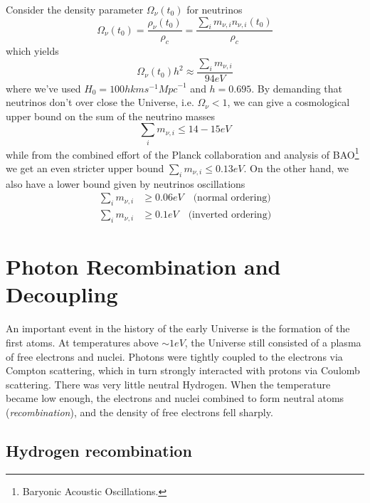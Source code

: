 Consider the density parameter $\Omega_{\nu}(t_{0})$ for neutrinos 
\begin{equation}
    \Omega_{\nu}(t_{0}) = \frac{\rho_{\nu}(t_{0})}{\rho_{c}} = \frac{\sum_{i} m_{\nu,i}n_{\nu,i}(t_{0})}{\rho_{c}}
\end{equation}
which yields
\begin{equation}
    \boxed{
        \Omega_{\nu}(t_{0})h^{2} \approx \frac{\sum_{i} m_{\nu,i}}{94 \unit{eV}}
    }
\end{equation}
where we've used $H_{0} = 100h \unit{km}\unit{s}^{-1}\unit{Mpc}^{-1}$ and $h = 0.695$. By demanding that neutrinos don’t over close the Universe, i.e. $\Omega_{\nu} < 1$, we can give a cosmological upper bound on the sum of the neutrino masses
\begin{equation}
    \sum_{i}m_{\nu,i} \leq 14-15\unit{eV}
\end{equation}
while from the combined effort of the Planck collaboration and analysis of BAO\footnote{Baryonic Acoustic Oscillations.} we get an even stricter upper bound $ \sum_{i}m_{\nu,i} \leq 0.13\unit{eV}$. On the other hand, we also have a lower bound given by neutrinos oscillations 
\begin{align*}
    \sum_{i}m_{\nu,i} &\geq 0.06\unit{eV} \quad \text{(normal ordering)}\\
    \sum_{i}m_{\nu,i} &\geq 0.1\unit{eV} \quad \text{(inverted ordering)}
\end{align*}

\section{Photon Recombination and Decoupling}

An important event in the history of the early Universe is the formation of the first atoms. At temperatures above $\sim 1 \unit{eV}$, the Universe still consisted of a plasma of free electrons and nuclei. Photons were tightly coupled to the electrons via Compton scattering, which in turn strongly interacted with protons via Coulomb scattering. There was very little neutral Hydrogen. When the temperature became low enough, the electrons and nuclei combined to form neutral atoms (\emph{recombination}), and the density of free electrons fell sharply.

\subsection{Hydrogen recombination}

